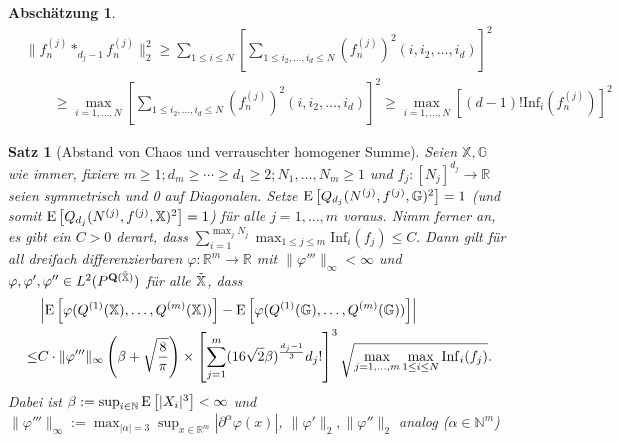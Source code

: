 \documentclass[11pt, ngerman]{scrartcl}
\theoremstyle{definition}
\theoremstyle{plain}
\newtheorem{satz}[definition]{Satz}
\newtheorem{Abschaetzung}[definition]{Abschätzung}
\newcommand{\R}[0]{\mathbb{R}}
\newcommand{\N}[0]{\mathbb{N}}
\newcommand{\homQGo}[1]{Q_{d_{#1}}(N^{(#1)}, f^{(#1)}, \mathbb{G})}
\newcommand{\homQXo}[1]{Q_{d_{#1}}(N^{(#1)}, f^{(#1)}, \mathbb{X})}
\newcommand{\E}[1][]{%
    \operatorname{E}%
    \ifx\\#1\\\else%
        \left[#1\right]%
    \fi%
}
\newcommand{\<}{\langle}
\renewcommand{\>}{\rangle}
\newcommand{\norm}[1]{\lVert#1\rVert}
\begin{document}
\begin{Abschaetzung}
    \begin{align*}
        &\norm{f_n^{(j)} *_{d_j -1 } f_n^{(j)}}_{2}^2  \geq  
         \sum_{1 \leq i \leq N} \left[\sum_{1 \leq i_2, \ldots, i_d \leq N} (f_n^{(j)})^2(i, i_2, \ldots, i_d)\right]^2 \\ & \qquad \geq \max_{i = 1, \ldots, N} \left[\sum_{1 \leq i_2, \ldots, i_d \leq N} (f_n^{(j)})^2(i, i_2, \ldots, i_d)\right]^2 \geq \max_{i = 1, \ldots, N}  \left[(d-1)! \text{Inf}_i(f_n^{(j)}) \right]^2
        \end{align*}
\end{Abschaetzung}
\begin{satz}[Abstand von Chaos und verrauschter homogener Summe]
       Seien $\mathbb{X}, \mathbb{G}$ wie immer, fixiere $m \geq 1; d_m \geq \cdots \geq d_1 \geq 2; N_1, \ldots, N_m \geq 1$ und $f_j: [N_j]^{d_j} \to \R$ seien symmetrisch und 0 auf Diagonalen. 
       Setze $\E[\homQGo{j}^2] = 1$ (und somit $\E[\homQXo{j}^2] =1$) für alle $j = 1, \ldots, m$ voraus.
        Nimm ferner an, es gibt ein $C > 0$ derart, dass $\sum_{i=1}^{\max_{j}N_j} \max_{1 \leq j \leq m} \mathrm{Inf}_i(f_j) \leq C.$ Dann gilt für all dreifach differenzierbaren $\varphi: \R^m \to \R$ mit $\norm{\varphi'''}_\infty < \infty$ und $\varphi, \varphi', \varphi'' \in L^2(P^{\mathbf{Q}(\Tilde{\mathbb{X}})})$ für alle $\Tilde{\mathbb{X}}$, dass \begin{align*}
        &\left|\E[\varphi(Q^{(1)}(\mathbb{X}), \ldots, Q^{(m)}(\mathbb{X}))] - \E[\varphi(Q^{(1)}(\mathbb{G}), \ldots, Q^{(m)}(\mathbb{G}))]\right| \\ \leq &  C \cdot \norm{\varphi'''}_\infty \left(\beta + \sqrt{\frac{8}{\pi}}\right)  \times \left[\sum_{j=1}^m (16 \sqrt{2} \beta)^{\frac{d_j-1}{3}} d_j!\right]^3 \sqrt{\max_{j=1, \ldots, m}\max_{1 \leq i \leq N} \mathrm{Inf}_i(f_j)}.
        \end{align*}
        Dabei ist $\beta := \sup_{i \in \N} \E[|X_i|^3] <\infty$ und $\norm{\varphi'''}_{\infty} := \max_{|\alpha| = 3} \sup_{x \in \R^m} |\partial^\alpha \varphi(x)|$, $\norm{\varphi'}_2, \norm{\varphi''}_2$ analog
         ($\alpha \in \N^{m}$) \end{satz}
\end{document}
